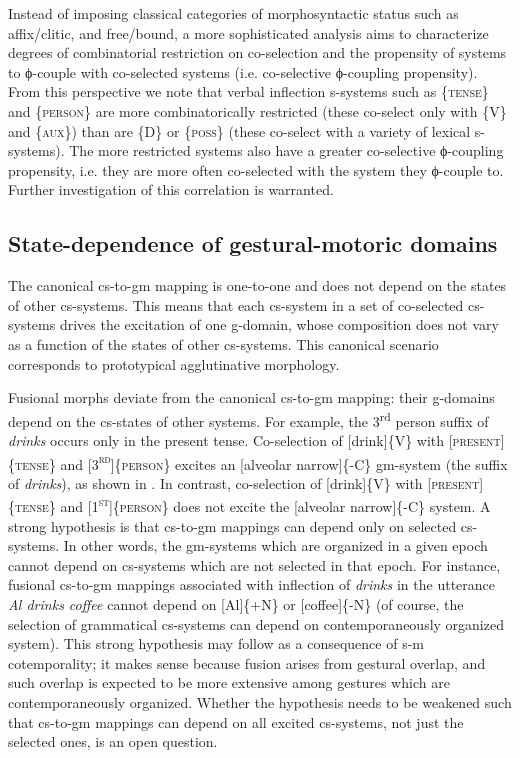   Instead of imposing classical categories of morphosyntactic status such as affix/clitic, and free/bound, a more sophisticated analysis aims to characterize degrees of combinatorial restriction on co-selection and the propensity of systems to ϕ-couple with co-selected systems (i.e. co-selective ϕ-coupling propensity). From this perspective we note that verbal inflection s-systems such as \{\textsc{tense}\} and \{\textsc{person}\} are more combinatorically restricted (these co-select only with \{V\} and \{\textsc{aux}\}) than are \{D\} or \{\textsc{poss}\} (these co-select with a variety of lexical s-systems). The more restricted systems also have a greater co-selective ϕ-coupling propensity, i.e. they are more often co-selected with the system they ϕ-couple to. Further investigation of this correlation is warranted.

\subsection{State-dependence of gestural-motoric domains}

The canonical cs-to-gm mapping is one-to-one and does not depend on the states of other cs-systems. This means that each cs-system in a set of co-selected cs-systems drives the excitation of one g-domain, whose composition does not vary as a function of the states of other cs-systems. This canonical scenario corresponds to prototypical agglutinative morphology. 

  Fusional morphs deviate from the canonical cs-to-gm mapping: their g-domains depend on the cs-states of other systems. For example, the 3\textsuperscript{rd} person suffix of \textit{drinks} occurs only in the present tense. Co-selection of [drink]\{V\} with [\textsc{present}]\{\textsc{tense}\} and [\textsc{3}\textsc{\textsuperscript{rd}}]\{\textsc{person}\} excites an [alveolar narrow]\{-C\} gm-system (the suffix of \textit{drinks}), as shown in {}. In contrast, co-selection of [drink]\{V\} with [\textsc{present]}\{\textsc{tense}\} and [\textsc{1}\textsc{\textsuperscript{st}}]\{\textsc{person}\} does not excite the [alveolar narrow]\{-C\} system. A strong hypothesis is that cs-to-gm mappings can depend only on selected cs-systems. In other words, the gm-systems which are organized in a given epoch cannot depend on cs-systems which are not selected in that epoch. For instance, fusional cs-to-gm mappings associated with inflection of \textit{drinks} in the utterance \textit{Al drinks coffee} cannot depend on [Al]\{+N\} or [coffee]\{-N\} (of course, the selection of grammatical cs-systems can depend on contemporaneously organized system). This strong hypothesis may follow as a consequence of s-m cotemporality; it makes sense because fusion arises from gestural overlap, and such overlap is expected to be more extensive among gestures which are contemporaneously organized. Whether the hypothesis needs to be weakened such that cs-to-gm mappings can depend on all excited cs-systems, not just the selected ones, is an open question.

